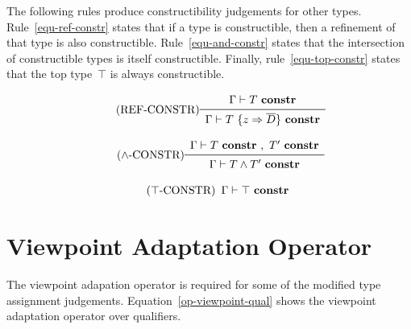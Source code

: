 \vspace{0.4cm}

The following rules produce constructibility judgements for other types.
Rule~\mbox{\ref{equ-ref-constr}} states that if a type is constructible,
then a refinement of that type is also constructible.
Rule~\mbox{\ref{equ-and-constr}} states that the intersection of constructible types
is itself constructible.
Finally, rule~\mbox{\ref{equ-top-constr}} states that the top type~$\top$
is always constructible.

\begin{equation*}\tag{REF-CONSTR}\label{equ-ref-constr}
\begin{array}{c}
\Gamma \vdash T\ {\bf constr} \\
\midrule
\Gamma \vdash T\ \{ z \Rightarrow \overline{D} \}\ {\bf constr} \\
\end{array}
\end{equation*}

\vspace{0.4cm}

\begin{equation*}\tag{$\land$-CONSTR}\label{equ-and-constr}
\begin{array}{c}
\Gamma \vdash T\ {\bf constr}\ ,\ T'\ {\bf constr} \\
\midrule
\Gamma \vdash T \land T'\ {\bf constr} \\
\end{array}
\end{equation*}

\vspace{0.4cm}

\begin{equation*}\tag{$\top$-CONSTR}\label{equ-top-constr}
\begin{array}{c}
\Gamma \vdash \top\ {\bf constr} \\
\end{array}
\end{equation*}

\vspace{0.4cm}


\section{Viewpoint Adaptation Operator} \label{sec-dot-vp-adapt}

The viewpoint adapation operator is required for some of
the modified type assignment judgements.
Equation~\ref{op-viewpoint-qual} shows the viewpoint adaptation operator
over qualifiers.

